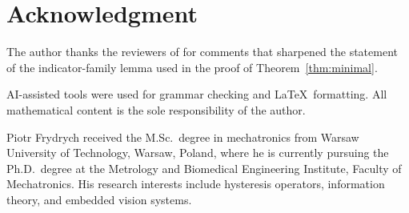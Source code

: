 \documentclass[lettersize,journal]{IEEEtran}
\begin{document}
\section*{Acknowledgment}

The author thanks the reviewers of \cite{Frydrych2026IPL} for
comments that sharpened the statement of the indicator-family lemma
used in the proof of Theorem~\ref{thm:minimal}.

{
AI-assisted tools were used for grammar checking and \LaTeX\
formatting. All mathematical content is the sole responsibility
of the author.}




\begin{IEEEbiographynophoto}{Piotr Frydrych}
received the M.Sc.\ degree in mechatronics from Warsaw University of
Technology, Warsaw, Poland, where he is currently pursuing the Ph.D.\
degree at the Metrology and Biomedical Engineering Institute,
Faculty of Mechatronics. His research interests include hysteresis
operators, information theory, and embedded vision systems.
\end{IEEEbiographynophoto}
\end{document}
